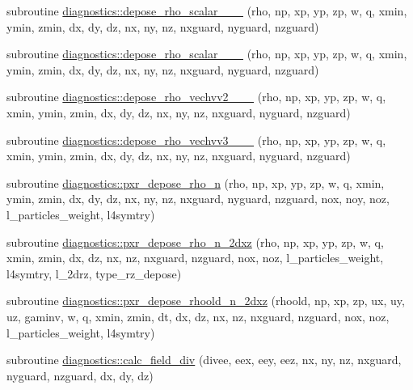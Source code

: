 \begin{DoxyCompactItemize}
\item 
subroutine \hyperlink{namespacediagnostics_aeb5c0a99b3e4cc7708ecaeb6326f21f6}{diagnostics\+::depose\+\_\+rho\+\_\+scalar\+\_\+\_\+\_} (rho, np, xp, yp, zp, w, q, xmin, ymin, zmin, dx, dy, dz, nx, ny, nz, nxguard, nyguard, nzguard)
\item 
subroutine \hyperlink{namespacediagnostics_a0767b1e1eb3f73ff84acdb523f574e25}{diagnostics\+::depose\+\_\+rho\+\_\+scalar\+\_\+\_\+\_} (rho, np, xp, yp, zp, w, q, xmin, ymin, zmin, dx, dy, dz, nx, ny, nz, nxguard, nyguard, nzguard)
\item 
subroutine \hyperlink{namespacediagnostics_a5b450ee961087e014783a7c06fe8df25}{diagnostics\+::depose\+\_\+rho\+\_\+vechvv2\+\_\+\_\+\_} (rho, np, xp, yp, zp, w, q, xmin, ymin, zmin, dx, dy, dz, nx, ny, nz, nxguard, nyguard, nzguard)
\item 
subroutine \hyperlink{namespacediagnostics_a7087b6f9a6ee62563b51f77e799377f6}{diagnostics\+::depose\+\_\+rho\+\_\+vechvv3\+\_\+\_\+\_} (rho, np, xp, yp, zp, w, q, xmin, ymin, zmin, dx, dy, dz, nx, ny, nz, nxguard, nyguard, nzguard)
\item 
subroutine \hyperlink{namespacediagnostics_a7d64ffee6339ffb7ca37adfe101c444d}{diagnostics\+::pxr\+\_\+depose\+\_\+rho\+\_\+n} (rho, np, xp, yp, zp, w, q, xmin, ymin, zmin, dx, dy, dz, nx, ny, nz,                                                                                       nxguard, nyguard, nzguard, nox, noy, noz,                                                                                           l\+\_\+particles\+\_\+weight, l4symtry)
\item 
subroutine \hyperlink{namespacediagnostics_a480ed63b3c5511d2cae7bbe81dd07334}{diagnostics\+::pxr\+\_\+depose\+\_\+rho\+\_\+n\+\_\+2dxz} (rho, np, xp, yp, zp, w, q, xmin, zmin, dx, dz, nx, nz, nxguard, nzguard, nox, noz, l\+\_\+particles\+\_\+weight, l4symtry, l\+\_\+2drz, type\+\_\+rz\+\_\+depose)
\item 
subroutine \hyperlink{namespacediagnostics_ad46a700a868c3f7e10a2579130729a65}{diagnostics\+::pxr\+\_\+depose\+\_\+rhoold\+\_\+n\+\_\+2dxz} (rhoold, np, xp, zp, ux, uy, uz, gaminv, w, q, xmin, zmin, dt, dx, dz, nx, nz, nxguard, nzguard, nox, noz, l\+\_\+particles\+\_\+weight, l4symtry)
\item 
subroutine \hyperlink{namespacediagnostics_a28ade3a7daafd373b08dd7742315ed98}{diagnostics\+::calc\+\_\+field\+\_\+div} (divee, eex, eey, eez, nx, ny, nz, nxguard, nyguard, nzguard, dx, dy, dz)
\item 

\end{DoxyCompactItemize}
